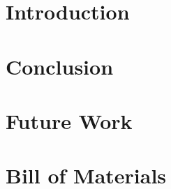 \documentclass{article}
\begin{document}
\section{Introduction}


\section{Conclusion}


\section{Future Work}

\section{Bill of Materials}
\end{document}

